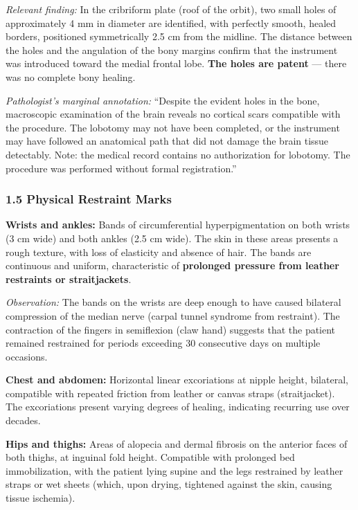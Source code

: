 \noindent \textit{Relevant finding:} In the cribriform plate (roof of the orbit), two small holes of approximately 4 mm in diameter are identified, with perfectly smooth, healed borders, positioned symmetrically 2.5 cm from the midline. The distance between the holes and the angulation of the bony margins confirm that the instrument was introduced toward the medial frontal lobe. \textbf{The holes are patent} --- there was no complete bony healing.

\noindent \textit{Pathologist's marginal annotation:} ``Despite the evident holes in the bone, macroscopic examination of the brain reveals no cortical scars compatible with the procedure. The lobotomy may not have been completed, or the instrument may have followed an anatomical path that did not damage the brain tissue detectably. Note: the medical record contains no authorization for lobotomy. The procedure was performed without formal registration.''

\subsubsection*{1.5 Physical Restraint Marks}

\noindent \textbf{Wrists and ankles:} Bands of circumferential hyperpigmentation on both wrists (3 cm wide) and both ankles (2.5 cm wide). The skin in these areas presents a rough texture, with loss of elasticity and absence of hair. The bands are continuous and uniform, characteristic of \textbf{prolonged pressure from leather restraints or straitjackets}.

\noindent \textit{Observation:} The bands on the wrists are deep enough to have caused bilateral compression of the median nerve (carpal tunnel syndrome from restraint). The contraction of the fingers in semiflexion (claw hand) suggests that the patient remained restrained for periods exceeding 30 consecutive days on multiple occasions.

\noindent \textbf{Chest and abdomen:} Horizontal linear excoriations at nipple height, bilateral, compatible with repeated friction from leather or canvas straps (straitjacket). The excoriations present varying degrees of healing, indicating recurring use over decades.

\noindent \textbf{Hips and thighs:} Areas of alopecia and dermal fibrosis on the anterior faces of both thighs, at inguinal fold height. Compatible with prolonged bed immobilization, with the patient lying supine and the legs restrained by leather straps or wet sheets (which, upon drying, tightened against the skin, causing tissue ischemia).

